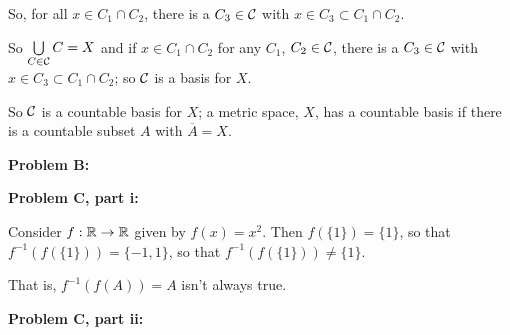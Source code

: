 \documentclass[a4paper,12pt]{article}
\begin{document}
So, for all $x \in C_1 \cap C_2$, there is a $C_3 \in \mathcal{C}$ with $x \in C_3 \subset C_1 \cap C_2$. 

So $\bigcup\limits_{C \in \mathcal{C}} C = X$ and if $x \in C_1 \cap C_2$ for any $C_1$, $C_2 \in \mathcal{C}$, there is a $C_3 \in \mathcal{C}$ with $x \in C_3 \subset C_1 \cap C_2$; so $\mathcal{C}$ is a basis for $X$.

So $\mathcal{C}$ is a countable basis for $X$; a metric space, $X$, has a countable basis if there is a countable subset $A$ with $\overline{A} = X$.



\shunt

{\bf Problem B:}

\shunt

{\bf Problem C, part i:}

Consider $f: \mathbb{R} \to \mathbb{R}$ given by $f(x) = x^2$. Then $f(\{1\}) = \{1\}$, so that $f^{-1}(f(\{1\})) = \{-1,1\}$, so that $f^{-1}(f(\{1\})) \neq \{1\}$.

That is, $f^{-1}(f(A)) = A$ isn't always true.

\shunt

{\bf Problem C, part ii:}

\shunt
\end{document}
